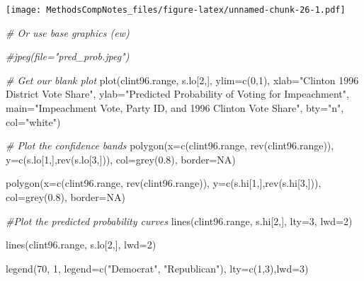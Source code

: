 \documentclass[
]{article}
\newenvironment{Shaded}{\begin{snugshade}}{\end{snugshade}}
\newcommand{\AttributeTok}[1]{\textcolor[rgb]{0.77,0.63,0.00}{#1}}
\newcommand{\CommentTok}[1]{\textcolor[rgb]{0.56,0.35,0.01}{\textit{#1}}}
\newcommand{\ConstantTok}[1]{\textcolor[rgb]{0.00,0.00,0.00}{#1}}
\newcommand{\DecValTok}[1]{\textcolor[rgb]{0.00,0.00,0.81}{#1}}
\newcommand{\FloatTok}[1]{\textcolor[rgb]{0.00,0.00,0.81}{#1}}
\newcommand{\FunctionTok}[1]{\textcolor[rgb]{0.00,0.00,0.00}{#1}}
\newcommand{\NormalTok}[1]{#1}
\newcommand{\StringTok}[1]{\textcolor[rgb]{0.31,0.60,0.02}{#1}}
\begin{document}
\texttt{[image: MethodsCompNotes\_files/figure-latex/unnamed-chunk-26-1.pdf]}

\begin{Shaded}
\begin{Highlighting}[]
\CommentTok{\# Or use base graphics (ew)}

\CommentTok{\#jpeg(file="pred\_prob.jpeg")}

\CommentTok{\# Get our blank plot}
\FunctionTok{plot}\NormalTok{(clint96.range, s.lo[}\DecValTok{2}\NormalTok{,], }\AttributeTok{ylim=}\FunctionTok{c}\NormalTok{(}\DecValTok{0}\NormalTok{,}\DecValTok{1}\NormalTok{),}
     \AttributeTok{xlab=}\StringTok{"Clinton 1996 District Vote Share"}\NormalTok{,}
     \AttributeTok{ylab=}\StringTok{"Predicted Probability of Voting for Impeachment"}\NormalTok{,}
     \AttributeTok{main=}\StringTok{"Impeachment Vote, Party ID, and 1996 Clinton Vote Share"}\NormalTok{,}
     \AttributeTok{bty=}\StringTok{"n"}\NormalTok{, }\AttributeTok{col=}\StringTok{"white"}\NormalTok{)}

\CommentTok{\# Plot the confidence bands}
\FunctionTok{polygon}\NormalTok{(}\AttributeTok{x=}\FunctionTok{c}\NormalTok{(clint96.range, }\FunctionTok{rev}\NormalTok{(clint96.range)),}
        \AttributeTok{y=}\FunctionTok{c}\NormalTok{(s.lo[}\DecValTok{1}\NormalTok{,],}\FunctionTok{rev}\NormalTok{(s.lo[}\DecValTok{3}\NormalTok{,])),}
        \AttributeTok{col=}\FunctionTok{grey}\NormalTok{(}\FloatTok{0.8}\NormalTok{), }\AttributeTok{border=}\ConstantTok{NA}\NormalTok{)}

\FunctionTok{polygon}\NormalTok{(}\AttributeTok{x=}\FunctionTok{c}\NormalTok{(clint96.range, }\FunctionTok{rev}\NormalTok{(clint96.range)),}
        \AttributeTok{y=}\FunctionTok{c}\NormalTok{(s.hi[}\DecValTok{1}\NormalTok{,],}\FunctionTok{rev}\NormalTok{(s.hi[}\DecValTok{3}\NormalTok{,])),}
        \AttributeTok{col=}\FunctionTok{grey}\NormalTok{(}\FloatTok{0.8}\NormalTok{), }\AttributeTok{border=}\ConstantTok{NA}\NormalTok{)}

\CommentTok{\#Plot the predicted probability curves}
\FunctionTok{lines}\NormalTok{(clint96.range, s.hi[}\DecValTok{2}\NormalTok{,], }\AttributeTok{lty=}\DecValTok{3}\NormalTok{, }\AttributeTok{lwd=}\DecValTok{2}\NormalTok{)}

\FunctionTok{lines}\NormalTok{(clint96.range, s.lo[}\DecValTok{2}\NormalTok{,], }\AttributeTok{lwd=}\DecValTok{2}\NormalTok{)}

\FunctionTok{legend}\NormalTok{(}\DecValTok{70}\NormalTok{, }\DecValTok{1}\NormalTok{, }\AttributeTok{legend=}\FunctionTok{c}\NormalTok{(}\StringTok{"Democrat"}\NormalTok{, }\StringTok{"Republican"}\NormalTok{), }\AttributeTok{lty=}\FunctionTok{c}\NormalTok{(}\DecValTok{1}\NormalTok{,}\DecValTok{3}\NormalTok{),}\AttributeTok{lwd=}\DecValTok{3}\NormalTok{)}
\end{Highlighting}
\end{Shaded}
\end{document}
